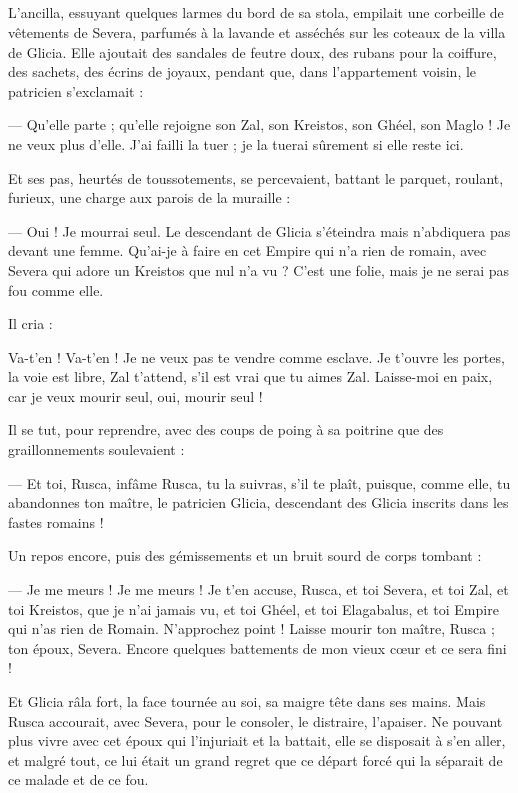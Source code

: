 \documentclass[a4paper, 11pt, oneside, polutonikogreek, french]{article}
\begin{document}
\subsection{}
\paragraph{}
L'ancilla, essuyant quelques larmes du bord de sa stola, empilait une corbeille de vêtements de Severa, parfumés à la lavande et asséchés sur les coteaux de la villa de Glicia. Elle ajoutait des sandales de feutre doux, des rubans pour la coiffure, des sachets, des écrins de joyaux, pendant que, dans l'appartement voisin, le patricien s'exclamait :

--- Qu'elle parte ; qu'elle rejoigne son Zal, son Kreistos, son Ghéel, son Maglo ! Je ne veux plus d'elle. J'ai failli la tuer ; je la tuerai sûrement si elle reste ici.

Et ses pas, heurtés de toussotements, se percevaient, battant le parquet, roulant, furieux, une charge aux parois de la muraille :

--- Oui ! Je mourrai seul. Le descendant de Glicia s'éteindra mais n'abdiquera pas devant une femme. Qu'ai-je à faire en cet Empire qui n'a rien de romain, avec Severa qui adore un Kreistos que nul n'a vu ? C'est une folie, mais je ne serai pas fou comme elle.

Il cria :

Va-t’en ! Va-t’en ! Je ne veux pas te vendre comme esclave. Je t'ouvre les portes, la voie est libre, Zal t'attend, s'il est vrai que tu aimes Zal. Laisse-moi en paix, car je veux mourir seul, oui, mourir seul !

Il se tut, pour reprendre, avec des coups de poing à sa poitrine que des graillonnements soulevaient :

--- Et toi, Rusca, infâme Rusca, tu la suivras, s'il te plaît, puisque, comme elle, tu abandonnes ton maître, le patricien Glicia, descendant des Glicia inscrits dans les fastes romains !

Un repos encore, puis des gémissements et un bruit sourd de corps tombant :

--- Je me meurs ! Je me meurs ! Je t'en accuse, Rusca, et toi Severa, et toi Zal, et toi Kreistos, que je n'ai jamais vu, et toi Ghéel, et toi Elagabalus, et toi Empire qui n'as rien de Romain. N'approchez point ! Laisse mourir ton maître, Rusca ; ton époux, Severa. Encore quelques battements de mon vieux cœur et ce sera fini !

Et Glicia râla fort, la face tournée au soi, sa maigre tête dans ses mains. Mais Rusca accourait, avec Severa, pour le consoler, le distraire, l'apaiser. Ne pouvant plus vivre avec cet époux qui l'injuriait et la battait, elle se disposait à s'en aller, et malgré tout, ce lui était un grand regret que ce départ forcé qui la séparait de ce malade et de ce fou.
\end{document}
